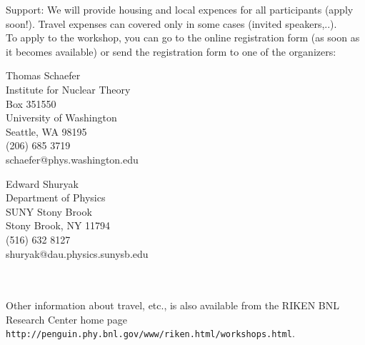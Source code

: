 \noindent 
Support: We will provide housing and local expences for all participants
(apply soon!). Travel expenses can covered only in some cases (invited
speakers,..). \\

\noindent
To apply to the workshop, you can go to the online registration form
(as soon as it becomes available) or send the registration form to 
one of the organizers: \\ 

\begin{minipage}{60mm}
\noindent
Thomas Schaefer\\
Institute for Nuclear Theory\\
Box 351550\\
University of Washington\\
Seattle, WA 98195\\
(206) 685 3719 \\
schaefer@phys.washington.edu 
\end{minipage}
\begin{minipage}{60mm}
\noindent
Edward Shuryak\\
Department of Physics\\
SUNY Stony Brook\\
Stony Brook, NY 11794\\
(516) 632 8127 \\
shuryak@dau.physics.sunysb.edu\\
\end{minipage}
\\ \\ 

\noindent
Other information about travel, etc., is also available from the RIKEN
BNL Research Center home page 
{\tt http://penguin.phy.bnl.gov/www/riken.html/workshops.html}.



